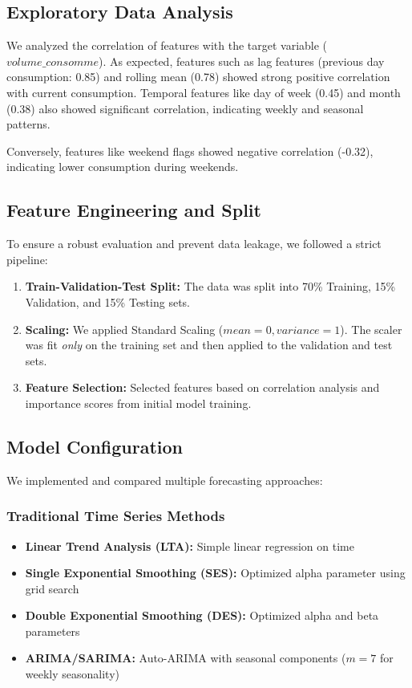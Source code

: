 \documentclass[conference]{IEEEtran}
\begin{document}
\subsection{Exploratory Data Analysis}

We analyzed the correlation of features with the target variable ($volume\_consomme$). As expected, features such as lag features (previous day consumption: 0.85) and rolling mean (0.78) showed strong positive correlation with current consumption. Temporal features like day of week (0.45) and month (0.38) also showed significant correlation, indicating weekly and seasonal patterns.

Conversely, features like weekend flags showed negative correlation (-0.32), indicating lower consumption during weekends.

\subsection{Feature Engineering and Split}

To ensure a robust evaluation and prevent data leakage, we followed a strict pipeline:

\begin{enumerate}
    \item \textbf{Train-Validation-Test Split:} The data was split into 70\% Training, 15\% Validation, and 15\% Testing sets.
    \item \textbf{Scaling:} We applied Standard Scaling ($mean=0, variance=1$). The scaler was fit \textit{only} on the training set and then applied to the validation and test sets.
    \item \textbf{Feature Selection:} Selected features based on correlation analysis and importance scores from initial model training.
\end{enumerate}

\subsection{Model Configuration}

We implemented and compared multiple forecasting approaches:

\subsubsection{Traditional Time Series Methods}
\begin{itemize}
    \item \textbf{Linear Trend Analysis (LTA):} Simple linear regression on time
    \item \textbf{Single Exponential Smoothing (SES):} Optimized alpha parameter using grid search \cite{b16,b10}
    \item \textbf{Double Exponential Smoothing (DES):} Optimized alpha and beta parameters \cite{b17,b10}
    \item \textbf{ARIMA/SARIMA:} Auto-ARIMA with seasonal components ($m=7$ for weekly seasonality) \cite{b8,b9}
\end{itemize}
\end{document}
